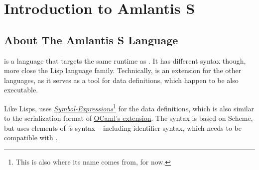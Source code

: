 
\chapter{Introduction to Amlantis S}

\minitoc

\newpage


\section{About The Amlantis S Language}

\AmlS is a language that targets the same runtime as \Aml. It has different syntax though, more close the Lisp language family. Technically, \AmlS is an extension for the other \Aml languages, as it serves as a tool for data definitions, which happen to be also executable. 

Like Lisps, \AmlS uses \href{http://people.csail.mit.edu/rivest/Sexp.txt}{{\em Symbol-Expressions}}\footnote{This is also where its name comes from, for now.} for the data definitions, which is also similar to the serialization format of \href{https://github.com/janestreet/sexplib}{OCaml's  extension}. The syntax is based on Scheme, but uses elements of \Aml's syntax -- including identifier syntax, which needs to be compatible with \Aml. 






